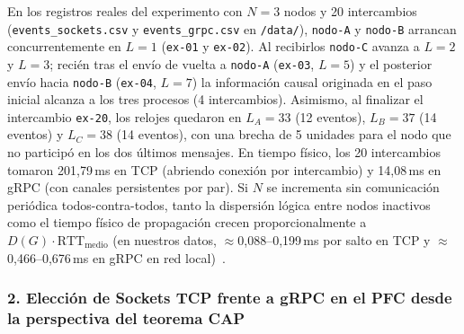 En los registros reales del experimento con $N = 3$ nodos y 20 intercambios (\texttt{events\_sockets.csv} y \texttt{events\_grpc.csv} en \texttt{/data/}), \texttt{nodo-A} y \texttt{nodo-B} arrancan concurrentemente en $L = 1$ (\texttt{ex-01} y \texttt{ex-02}). Al recibirlos \texttt{nodo-C} avanza a $L = 2$ y $L = 3$; recién tras el envío de vuelta a \texttt{nodo-A} (\texttt{ex-03}, $L = 5$) y el posterior envío hacia \texttt{nodo-B} (\texttt{ex-04}, $L = 7$) la información causal originada en el paso inicial alcanza a los tres procesos (4 intercambios). Asimismo, al finalizar el intercambio \texttt{ex-20}, los relojes quedaron en $L_A = 33$ (12 eventos), $L_B = 37$ (14 eventos) y $L_C = 38$ (14 eventos), con una brecha de 5 unidades para el nodo que no participó en los dos últimos mensajes. En tiempo físico, los 20 intercambios tomaron 201,79\,ms en TCP (abriendo conexión por intercambio) y 14,08\,ms en gRPC (con canales persistentes por par). Si $N$ se incrementa sin comunicación periódica todos-contra-todos, tanto la dispersión lógica entre nodos inactivos como el tiempo físico de propagación crecen proporcionalmente a $D(G) \cdot \mathrm{RTT}_{\mathrm{medio}}$ (en nuestros datos, $\approx$0,088--0,199\,ms por salto en TCP y $\approx$0,466--0,676\,ms en gRPC en red local)~\cite{castello2024inductive,mathur2022treeclock}.

\subsubsection{2. Elección de Sockets TCP frente a gRPC en el PFC desde la perspectiva del teorema CAP}

